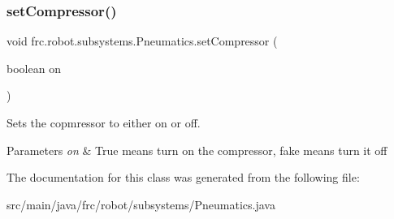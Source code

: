\subsubsection{\texorpdfstring{setCompressor()}{setCompressor()}}
{\footnotesize\ttfamily void frc.\+robot.\+subsystems.\+Pneumatics.\+set\+Compressor (\begin{DoxyParamCaption}\item[{boolean}]{on }\end{DoxyParamCaption})\hspace{0.3cm}{\ttfamily [inline]}}



Sets the copmressor to either on or off. 


\begin{DoxyParams}{Parameters}
{\em on} & True means turn on the compressor, fake means turn it off \\
\hline
\end{DoxyParams}


The documentation for this class was generated from the following file\+:\begin{DoxyCompactItemize}
\item 
src/main/java/frc/robot/subsystems/Pneumatics.\+java\end{DoxyCompactItemize}

